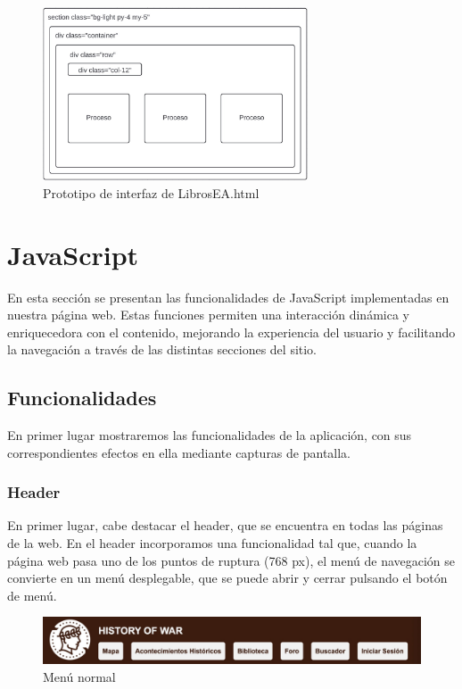 \documentclass{article}
\begin{document}
\begin{figure}[H]
    \centering
    \includegraphics[width=0.7\textwidth]{cssFotos/LibrosEAEsquema.jpg}
    \caption{Prototipo de interfaz de LibrosEA.html}
    \label{fig:prototipo_foro}
\end{figure}

\newpage

\section{JavaScript}

En esta sección se presentan las funcionalidades de JavaScript implementadas en nuestra página web. Estas funciones permiten una interacción dinámica y enriquecedora con el contenido, mejorando la experiencia del usuario y facilitando la navegación a través de las distintas secciones del sitio.

\subsection{Funcionalidades}

En primer lugar mostraremos las funcionalidades de la aplicación, con sus correspondientes efectos en ella mediante capturas de pantalla.

\subsubsection{Header}

En primer lugar, cabe destacar el header, que se encuentra en todas las páginas de la web. En el header incorporamos una funcionalidad tal que, cuando la página web pasa uno de los puntos de ruptura (768 px), el menú de navegación se convierte en un menú desplegable, que se puede abrir y cerrar pulsando el botón de menú.

\begin{figure}[H]
    \centering
    \includegraphics[width=1\textwidth]{jsFotos/headerJS.jpg}
    \caption{Menú normal}
    \label{fig:foro_interface}
\end{figure}
\end{document}
